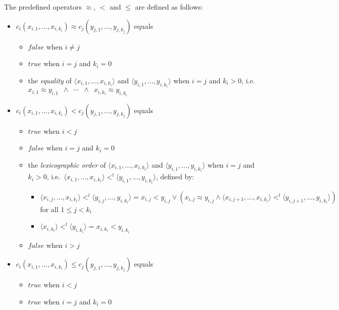 \documentclass[a4paper,fleqn]{article}
\newcommand{\f}[1]{\ensuremath{\mathit{#1}}}
\newcommand{\true}{\ensuremath{\f{true}}}
\newcommand{\false}{\ensuremath{\f{false}}}
\newcommand{\oeq}{\ensuremath{\approx}}
\begin{document}
\noindent
The predefined operators $\oeq$, $<$ and $\leq$ are defined as follows:
\begin{itemize}
\item ${c_{i}(x_{i,1}, \ldots , x_{i,k_{i}}) \oeq c_{j}(y_{j,1}, \ldots , y_{j,k_{j}})}$ equals
  \begin{itemize}
  \item ${\false}$ when ${i \neq j}$
  \item ${\true}$ when ${i = j}$ and ${k_{i} = 0}$
  \item the \emph{equality} of ${\langle x_{i,1}, \ldots , x_{i,k_{i}} \rangle}$ and ${\langle y_{i,1}, \ldots , y_{i,k_{i}} \rangle}$ when ${i = j}$ and ${k_{i} > 0}$, i.e.\ ${x_{i,1} \oeq y_{i,1}\enspace \land \enspace \cdots \enspace \land \enspace x_{i,k_{i}} \oeq y_{i,k_{i}}}$
  \end{itemize}
\item ${c_{i}(x_{i,1}, \ldots , x_{i,k_{i}}) < c_{j}(y_{j,1}, \ldots , y_{j,k_{j}})}$ equals
  \begin{itemize}
  \item ${\true}$ when ${i < j}$
  \item ${\false}$ when ${i = j}$ and ${k_{i} = 0}$
  \item the \emph{lexicographic order} of ${\langle x_{i,1}, \ldots , x_{i,k_{i}} \rangle}$ and ${\langle y_{i,1}, \ldots , y_{i,k_{i}} \rangle}$ when ${i = j}$ and ${k_{i} > 0}$, i.e.\ ${\langle x_{i,1}, \ldots , x_{i,k_{i}}\rangle <^{l} \langle y_{i,1}, \ldots , y_{i,k_{i}} \rangle}$, defined by:
    \begin{itemize}
    \item ${\langle x_{i,j}, \ldots, x_{i,k_{i}} \rangle <^{l} \langle y_{i,j}, \ldots, y_{i,k_{i}} \rangle = x_{i,j} < y_{i,j} \lor (x_{i,j} \oeq y_{i,j} \land \langle x_{i,j+1}, \ldots, x_{i,k_{i}} \rangle <^{l} \langle y_{i,j+1}, \ldots, y_{i,k_{i}} \rangle)}$ for all ${1 \leq j < k_{i}}$
    \item ${\langle x_{i,k_{i}} \rangle <^{l} \langle y_{i,k_{i}} \rangle = x_{i,k_{i}} < y_{i,k_{i}}}$
    \end{itemize}
  \item ${\false}$ when ${i > j}$
  \end{itemize}
\item ${c_{i}(x_{i,1}, \ldots , x_{i,k_{i}}) \leq c_{j}(y_{j,1}, \ldots , y_{j,k_{j}})}$ equals
  \begin{itemize}
  \item ${\true}$ when ${i < j}$
  \item ${\true}$ when ${i = j}$ and ${k_{i} = 0}$

\end{itemize}
\end{itemize}
\end{document}
